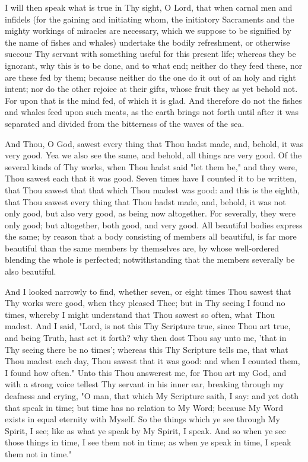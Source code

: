 \documentclass[b5paper,openright,12pt,twoside]{book}
\begin{document}
I will then speak what is true in Thy sight, O Lord, that when carnal
men and infidels (for the gaining and initiating whom, the initiatory
Sacraments and the mighty workings of miracles are necessary, which we
suppose to be signified by the name of fishes and whales) undertake
the bodily refreshment, or otherwise succour Thy servant with something
useful for this present life; whereas they be ignorant, why this is to
be done, and to what end; neither do they feed these, nor are these
fed by them; because neither do the one do it out of an holy and right
intent; nor do the other rejoice at their gifts, whose fruit they as
yet behold not. For upon that is the mind fed, of which it is glad.
And therefore do not the fishes and whales feed upon such meats, as the
earth brings not forth until after it was separated and divided from the
bitterness of the waves of the sea.

And Thou, O God, sawest every thing that Thou hadst made, and, behold,
it was very good. Yea we also see the same, and behold, all things are
very good. Of the several kinds of Thy works, when Thou hadst said "let
them be," and they were, Thou sawest each that it was good. Seven times
have I counted it to be written, that Thou sawest that that which Thou
madest was good: and this is the eighth, that Thou sawest every thing
that Thou hadst made, and, behold, it was not only good, but also very
good, as being now altogether. For severally, they were only good; but
altogether, both good, and very good. All beautiful bodies express the
same; by reason that a body consisting of members all beautiful, is
far more beautiful than the same members by themselves are, by whose
well-ordered blending the whole is perfected; notwithstanding that the
members severally be also beautiful.

And I looked narrowly to find, whether seven, or eight times Thou sawest
that Thy works were good, when they pleased Thee; but in Thy seeing I
found no times, whereby I might understand that Thou sawest so often,
what Thou madest. And I said, "Lord, is not this Thy Scripture true,
since Thou art true, and being Truth, hast set it forth? why then dost
Thou say unto me, 'that in Thy seeing there be no times'; whereas this
Thy Scripture tells me, that what Thou madest each day, Thou sawest that
it was good: and when I counted them, I found how often." Unto this Thou
answerest me, for Thou art my God, and with a strong voice tellest Thy
servant in his inner ear, breaking through my deafness and crying, "O
man, that which My Scripture saith, I say: and yet doth that speak in
time; but time has no relation to My Word; because My Word exists
in equal eternity with Myself. So the things which ye see through My
Spirit, I see; like as what ye speak by My Spirit, I speak. And so when
ye see those things in time, I see them not in time; as when ye speak in
time, I speak them not in time."
\end{document}
